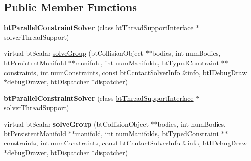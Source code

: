 \subsection*{Public Member Functions}
\begin{DoxyCompactItemize}
\item 
\mbox{\label{classbtParallelConstraintSolver_acb3d5063e1894e7340b9cc5b76feead4}} 
{\bfseries bt\+Parallel\+Constraint\+Solver} (class \hyperlink{classbtThreadSupportInterface}{bt\+Thread\+Support\+Interface} $\ast$solver\+Thread\+Support)
\item 
virtual bt\+Scalar \hyperlink{classbtParallelConstraintSolver_a2713bd22bd322034ba8470186105ff22}{solve\+Group} (bt\+Collision\+Object $\ast$$\ast$bodies, int num\+Bodies, bt\+Persistent\+Manifold $\ast$$\ast$manifold, int num\+Manifolds, bt\+Typed\+Constraint $\ast$$\ast$constraints, int num\+Constraints, const \hyperlink{structbtContactSolverInfo}{bt\+Contact\+Solver\+Info} \&info, \hyperlink{classbtIDebugDraw}{bt\+I\+Debug\+Draw} $\ast$debug\+Drawer, \hyperlink{classbtDispatcher}{bt\+Dispatcher} $\ast$dispatcher)
\item 
\mbox{\label{classbtParallelConstraintSolver_acb3d5063e1894e7340b9cc5b76feead4}} 
{\bfseries bt\+Parallel\+Constraint\+Solver} (class \hyperlink{classbtThreadSupportInterface}{bt\+Thread\+Support\+Interface} $\ast$solver\+Thread\+Support)
\item 
\mbox{\label{classbtParallelConstraintSolver_ada367d111584d1f96edde2b448f50e6f}} 
virtual bt\+Scalar {\bfseries solve\+Group} (bt\+Collision\+Object $\ast$$\ast$bodies, int num\+Bodies, bt\+Persistent\+Manifold $\ast$$\ast$manifold, int num\+Manifolds, bt\+Typed\+Constraint $\ast$$\ast$constraints, int num\+Constraints, const \hyperlink{structbtContactSolverInfo}{bt\+Contact\+Solver\+Info} \&info, \hyperlink{classbtIDebugDraw}{bt\+I\+Debug\+Draw} $\ast$debug\+Drawer, \hyperlink{classbtDispatcher}{bt\+Dispatcher} $\ast$dispatcher)
\end{DoxyCompactItemize}
